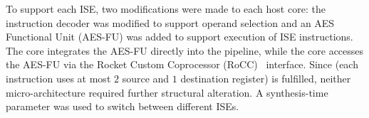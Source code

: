 \noindent
To support each ISE, two modifications were made to each host core:
the instruction decoder was modified to support
operand selection
and
an AES Functional Unit (AES-FU) was added to support execution of
ISE instructions.
The  core integrates the AES-FU directly into the pipeline,
while
the  core accesses the AES-FU via the
Rocket Custom Coprocessor (RoCC)~\cite[Section 4]{rocket:16}
interface.
Since 
(each instruction uses at most $2$ source and $1$ destination register)
is fulfilled,
neither micro-architecture required further structural alteration.
A synthesis-time parameter was used to switch between different 
ISEs.

